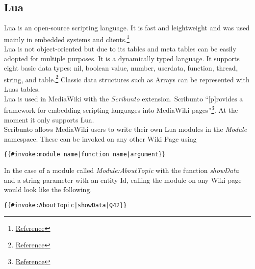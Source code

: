\documentclass[11pt]{article}
\begin{document}
\subsection{Lua}

Lua is an open-source scripting language. It is fast and leightweight and was used mainly in embedded systems and clients.\footnote{\href{http://www.lua.org/about.html}{Reference}} \\
Lua is not object-oriented but due to its tables and meta tables can be easily adopted for multiple purposes. It is a dynamically typed language. It supports eight basic data types: nil, boolean value, number, userdata, function, thread, string, and table.\footnote{\href{http://www.lua.org/pil/2.html}{Reference}} Classic data structures such as Arrays can be represented with Luas tables. \\
Lua is used in MediaWiki with the \textit{Scribunto} extension. Scribunto ``[p]rovides a framework for embedding scripting languages into MediaWiki pages''\footnote{\href{https://www.mediawiki.org/wiki/Extension:Scribunto}{Reference}}. At the moment it only supports Lua. \\
Scribunto allows MediaWiki users to write their own Lua modules in the \textit{Module} namespace. These can be invoked on any other Wiki Page using \\
\begin{lstlisting}[frame=single] 
{{#invoke:module name|function name|argument}}
\end{lstlisting}

In the case of a module called \textit{Module:AboutTopic} with the function \textit{showData} and a string parameter with an entity Id, calling the module on any Wiki page would look like the following. \\
\begin{lstlisting}[frame=single] 
{{#invoke:AboutTopic|showData|Q42}}
\end{lstlisting}
\end{document}
